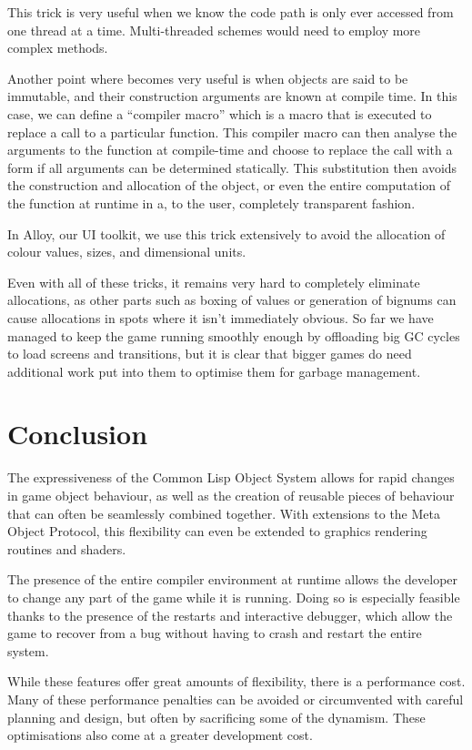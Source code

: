 \documentclass[a4paper]{paper}
\begin{document}
This trick is very useful when we know the code path is only ever accessed from one thread at a time. Multi-threaded schemes would need to employ more complex methods.

Another point where  becomes very useful is when objects are said to be immutable, and their construction arguments are known at compile time. In this case, we can define a ``compiler macro'' which is a macro that is executed to replace a call to a particular function. This compiler macro can then analyse the arguments to the function at compile-time and choose to replace the call with a  form if all arguments can be determined statically. This substitution then avoids the construction and allocation of the object, or even the entire computation of the function at runtime in a, to the user, completely transparent fashion.

In Alloy, our UI toolkit, we use this trick extensively to avoid the allocation of colour values, sizes, and dimensional units.

Even with all of these tricks, it remains very hard to completely eliminate allocations, as other parts such as boxing of values or generation of bignums can cause allocations in spots where it isn't immediately obvious. So far we have managed to keep the game running smoothly enough by offloading big GC cycles to load screens and transitions, but it is clear that bigger games do need additional work put into them to optimise them for garbage management.

\section{Conclusion}
The expressiveness of the Common Lisp Object System allows for rapid changes in game object behaviour, as well as the creation of reusable pieces of behaviour that can often be seamlessly combined together. With extensions to the Meta Object Protocol, this flexibility can even be extended to graphics rendering routines and shaders.

The presence of the entire compiler environment at runtime allows the developer to change any part of the game while it is running. Doing so is especially feasible thanks to the presence of the restarts and interactive debugger, which allow the game to recover from a bug without having to crash and restart the entire system.

While these features offer great amounts of flexibility, there is a performance cost. Many of these performance penalties can be avoided or circumvented with careful planning and design, but often by sacrificing some of the dynamism. These optimisations also come at a greater development cost.
\end{document}
